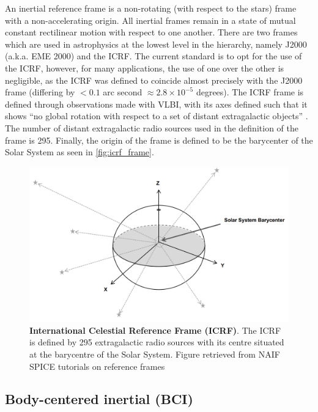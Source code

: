 An inertial reference frame is a non-rotating (with respect to the stars) frame with a non-accelerating origin. All inertial frames remain in a state of mutual constant rectilinear motion with respect to one another.  There are two frames which are used in astrophysics at the lowest level in the hierarchy, namely J2000 (a.k.a. EME 2000) and the \gls{ICRF}. The current standard is to opt for the use of the ICRF, however, for many applications, the use of one over the other is negligible, as the ICRF was defined to coincide almost precisely with the J2000 frame (differing by $<0.1$ arc second $\approx 2.8\times 10^{-5}$ degrees). The ICRF frame is defined through observations made with \gls{VLBI}, with its axes defined such that it shows ``no global rotation with respect to a set of distant extragalactic objects''  \cite{IAU1991, IAU1997}. The number of distant extragalactic radio sources used in the definition of the frame is 295. Finally, the origin of the frame is defined to be the barycenter of the Solar System as seen in \autoref{fig:icrf_frame}.

\begin{figure}
    \centering
    \captionsetup{format=hang} %
    \includegraphics[width=0.72\linewidth]{graphics/icrf.png}
    \caption{\textbf{International Celestial Reference Frame (ICRF)}. The \gls{ICRF} is defined by 295 extragalactic radio sources with its centre situated at the barycentre of the Solar System. Figure retrieved from \gls{NAIF} SPICE tutorials on reference frames \cite[p.~11]{SpiceReferenceFrames2020}}
    \label{fig:icrf_frame}
\end{figure}

\subsection{Body-centered inertial (BCI)}

